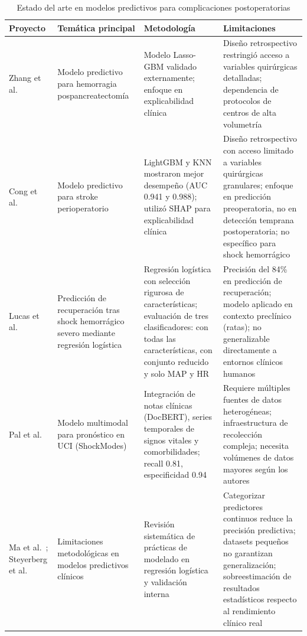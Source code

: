 \begin{table}[H]
\centering
\caption{Estado del arte en modelos predictivos para complicaciones postoperatorias}
\label{tab:estado-arte}
\small
\begin{tabular}{|p{2.5cm}|p{3cm}|p{4.5cm}|p{4.5cm}|}
\hline
\textbf{Proyecto} & \textbf{Temática principal} & \textbf{Metodología} & \textbf{Limitaciones} \\ \hline
Zhang et al.\ \cite{zhang2025} & Modelo predictivo para hemorragia pospancreatectomía & Modelo Lasso-GBM validado externamente; enfoque en explicabilidad clínica & Diseño retrospectivo restringió acceso a variables quirúrgicas detalladas; dependencia de protocolos de centros de alta volumetría \\ \hline
Cong et al.\ \cite{cong2025} & Modelo predictivo para stroke perioperatorio & LightGBM y KNN mostraron mejor desempeño (AUC 0.941 y 0.988); utilizó SHAP para explicabilidad clínica & Diseño retrospectivo con acceso limitado a variables quirúrgicas granulares; enfoque en predicción preoperatoria, no en detección temprana postoperatoria; no específico para shock hemorrágico \\ \hline
Lucas et al.\ \cite{lucas2019} & Predicción de recuperación tras shock hemorrágico severo mediante regresión logística & Regresión logística con selección rigurosa de características; evaluación de tres clasificadores: con todas las características, con conjunto reducido y solo MAP y HR & Precisión del 84\% en predicción de recuperación; modelo aplicado en contexto preclínico (ratas); no generalizable directamente a entornos clínicos humanos \\ \hline
Pal et al.\ \cite{pal2022} & Modelo multimodal para pronóstico en UCI (ShockModes) & Integración de notas clínicas (DocBERT), series temporales de signos vitales y comorbilidades; recall 0.81, especificidad 0.94 & Requiere múltiples fuentes de datos heterogéneas; infraestructura de recolección compleja; necesita volúmenes de datos mayores según los autores \\ \hline
Ma et al.\ \cite{ma2023}; Steyerberg et al.\ \cite{steyerberg2018} & Limitaciones metodológicas en modelos predictivos clínicos & Revisión sistemática de prácticas de modelado en regresión logística y validación interna & Categorizar predictores continuos reduce la precisión predictiva; datasets pequeños no garantizan generalización; sobreestimación de resultados estadísticos respecto al rendimiento clínico real \\ \hline
\end{tabular}
\end{table}

\newpage

